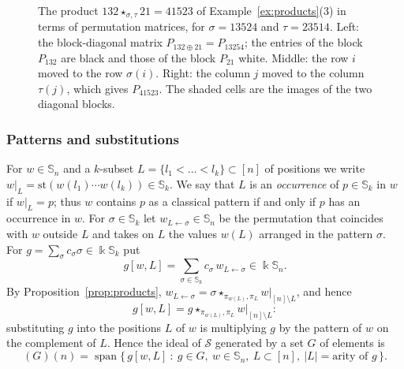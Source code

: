 \documentclass[11pt]{amsart}
\theoremstyle{definition}
\theoremstyle{remark}
\newcommand{\bS}{\mathbb{S}}
\newcommand{\kk}{\Bbbk}
\newcommand{\st}{\mathrm{st}}
\newcommand{\cS}{\mathscr{S}}
\newcommand{\gridlines}[2]{\draw[gray!55,very thin] (0,0) grid (#1,-#2);}
\newcommand{\shadecell}[3][gray!50]{\fill[#1] (#3-1,-#2) rectangle (#3,1-#2);}
\newcommand{\pt}[2]{\fill (#2-0.5,0.5-#1) circle (0.16);}
\newcommand{\opt}[2]{\draw[semithick,fill=white] (#2-0.5,0.5-#1) circle (0.16);}
\begin{document}
\begin{figure}[ht]
\centering
{}
\caption{The product $132\star_{\sigma,\tau}21=41523$ of Example~\ref{ex:products}(3) in terms of permutation matrices, for $\sigma=13524$ and $\tau=23514$. Left: the block-diagonal matrix $P_{132\oplus21}=P_{13254}$; the entries of the block $P_{132}$ are black and those of the block $P_{21}$ white. Middle: the row $i$ moved to the row $\sigma(i)$. Right: the column $j$ moved to the column $\tau(j)$, which gives $P_{41523}$. The shaded cells are the images of the two diagonal blocks.}\label{fig:matrices}
\end{figure}

\subsubsection{Patterns and substitutions}
For $w\in\bS_n$ and a $k$-subset $L=\{l_1<\dots<l_k\}\subset[n]$ of positions we write $w|_L=\st(w(l_1)\cdots w(l_k))\in\bS_k$. We say that $L$ is an \emph{occurrence} of $p\in\bS_k$ in $w$ if $w|_L=p$; thus $w$ contains $p$ as a classical pattern if and only if $p$ has an occurrence in $w$. For $\sigma\in\bS_k$ let $w_{L\leftarrow\sigma}\in\bS_n$ be the permutation that coincides with $w$ outside $L$ and takes on $L$ the values $w(L)$ arranged in the pattern $\sigma$. For $g=\sum_\sigma c_\sigma\sigma\in\kk\bS_k$ put
\[
g[w,L]=\sum_{\sigma\in\bS_k}c_\sigma\,w_{L\leftarrow\sigma}\in\kk\bS_n .
\]
By Proposition~\ref{prop:products}, $w_{L\leftarrow\sigma}=\sigma\star_{\pi_{w(L)},\pi_L}w|_{[n]\setminus L}$, and hence
\[
g[w,L]=g\star_{\pi_{w(L)},\pi_L}w|_{[n]\setminus L}:
\]
substituting $g$ into the positions $L$ of $w$ is multiplying $g$ by the pattern of $w$ on the complement of $L$. Hence the ideal of $\cS$ generated by a set $G$ of elements is
\[
(G)(n)=\operatorname{span}\bigl\{\,g[w,L]\ :\ g\in G,\ w\in\bS_n,\ L\subset[n],\ |L|=\text{arity of }g\,\bigr\}.
\]
\end{document}
